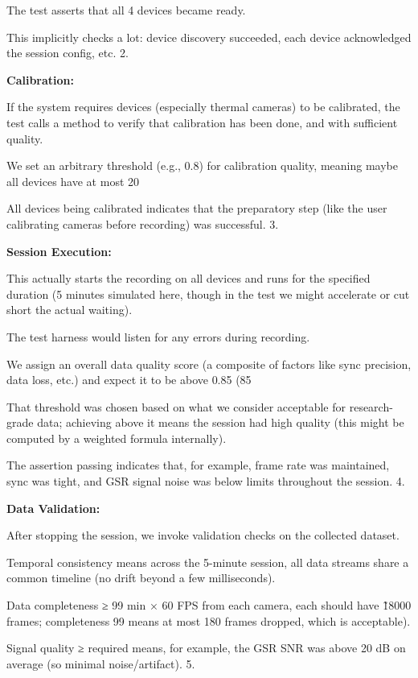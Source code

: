 {{The test asserts that all 4 devices became ready.

This implicitly checks a lot: device discovery succeeded, each device acknowledged
the session config, etc.  2.

\textbf{Calibration:}

If the system requires devices (especially thermal cameras) to be calibrated, the
test calls a method to verify that calibration has been done, and with sufficient
quality.

We set an arbitrary threshold (e.g., 0.8) for calibration quality, meaning maybe all
devices have at most 20%

All devices being calibrated indicates that the preparatory step (like the user
calibrating cameras before recording) was successful.  3.

\textbf{Session Execution:}

This actually starts the recording on all devices and runs for the specified duration
(5 minutes simulated here, though in the test we might accelerate or cut short the
actual waiting).

The test harness would listen for any errors during recording.

We assign an overall data quality score (a composite of factors like sync precision,
data loss, etc.) and expect it to be above 0.85 (85%

That threshold was chosen based on what we consider acceptable for research-grade
data; achieving above it means the session had high quality (this might be computed
by a weighted formula internally).

The assertion passing indicates that, for example, frame rate was maintained, sync
was tight, and GSR signal noise was below limits throughout the session.  4.

\textbf{Data Validation:}

After stopping the session, we invoke validation checks on the collected dataset.

Temporal consistency means across the 5-minute session, all data streams share a
common timeline (no drift beyond a few milliseconds).

Data completeness ≥ 99%
min × 60 FPS from each camera, each should have \~18000 frames; completeness 99%
means at most 180 frames dropped, which is acceptable).

Signal quality ≥ required means, for example, the GSR SNR was above 20 dB on average
(so minimal noise/artifact).  5.

}}
